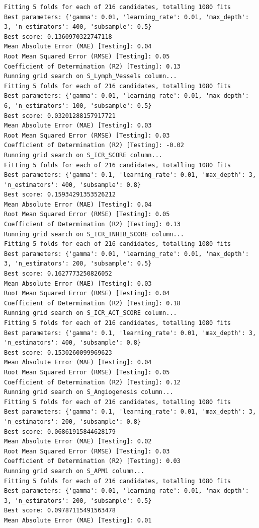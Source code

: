 \documentclass[
  letterpaper,
  DIV=11,
  numbers=noendperiod]{scrartcl}
\begin{document}
\begin{verbatim}
Fitting 5 folds for each of 216 candidates, totalling 1080 fits
Best parameters: {'gamma': 0.01, 'learning_rate': 0.01, 'max_depth': 3, 'n_estimators': 400, 'subsample': 0.5}
Best score: 0.1360970322747118
Mean Absolute Error (MAE) [Testing]: 0.04
Root Mean Squared Error (RMSE) [Testing]: 0.05
Coefficient of Determination (R2) [Testing]: 0.13
Running grid search on S_Lymph_Vessels column...
Fitting 5 folds for each of 216 candidates, totalling 1080 fits
Best parameters: {'gamma': 0.01, 'learning_rate': 0.01, 'max_depth': 6, 'n_estimators': 100, 'subsample': 0.5}
Best score: 0.03201288157917721
Mean Absolute Error (MAE) [Testing]: 0.03
Root Mean Squared Error (RMSE) [Testing]: 0.03
Coefficient of Determination (R2) [Testing]: -0.02
Running grid search on S_ICR_SCORE column...
Fitting 5 folds for each of 216 candidates, totalling 1080 fits
Best parameters: {'gamma': 0.1, 'learning_rate': 0.01, 'max_depth': 3, 'n_estimators': 400, 'subsample': 0.8}
Best score: 0.15934291353526212
Mean Absolute Error (MAE) [Testing]: 0.04
Root Mean Squared Error (RMSE) [Testing]: 0.05
Coefficient of Determination (R2) [Testing]: 0.13
Running grid search on S_ICR_INHIB_SCORE column...
Fitting 5 folds for each of 216 candidates, totalling 1080 fits
Best parameters: {'gamma': 0.01, 'learning_rate': 0.01, 'max_depth': 3, 'n_estimators': 200, 'subsample': 0.5}
Best score: 0.1627773250826052
Mean Absolute Error (MAE) [Testing]: 0.03
Root Mean Squared Error (RMSE) [Testing]: 0.04
Coefficient of Determination (R2) [Testing]: 0.18
Running grid search on S_ICR_ACT_SCORE column...
Fitting 5 folds for each of 216 candidates, totalling 1080 fits
Best parameters: {'gamma': 0.1, 'learning_rate': 0.01, 'max_depth': 3, 'n_estimators': 400, 'subsample': 0.8}
Best score: 0.1530260099969623
Mean Absolute Error (MAE) [Testing]: 0.04
Root Mean Squared Error (RMSE) [Testing]: 0.05
Coefficient of Determination (R2) [Testing]: 0.12
Running grid search on S_Angiogenesis column...
Fitting 5 folds for each of 216 candidates, totalling 1080 fits
Best parameters: {'gamma': 0.1, 'learning_rate': 0.01, 'max_depth': 3, 'n_estimators': 200, 'subsample': 0.8}
Best score: 0.06861915844628179
Mean Absolute Error (MAE) [Testing]: 0.02
Root Mean Squared Error (RMSE) [Testing]: 0.03
Coefficient of Determination (R2) [Testing]: 0.03
Running grid search on S_APM1 column...
Fitting 5 folds for each of 216 candidates, totalling 1080 fits
Best parameters: {'gamma': 0.01, 'learning_rate': 0.01, 'max_depth': 3, 'n_estimators': 200, 'subsample': 0.5}
Best score: 0.09787115491563478
Mean Absolute Error (MAE) [Testing]: 0.01

\end{verbatim}
\end{document}

